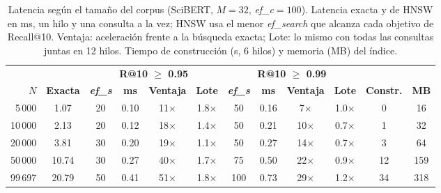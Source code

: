 \begin{table}[tbp]
\caption{Latencia según el tamaño del corpus (SciBERT, $M=32$, \textit{ef\_c}$=100$). Latencia exacta y de HNSW en ms, un hilo y una consulta a la vez; HNSW usa el menor \textit{ef\_search} que alcanza cada objetivo de Recall@10. Ventaja: aceleración frente a la búsqueda exacta; Lote: lo mismo con todas las consultas juntas en 12 hilos. Tiempo de construcción (s, 6 hilos) y memoria (MB) del índice.}\label{tab:escalabilidad_scibert}
\centering
\small
\begin{tabular}{|r|c|c|c|c|c|c|c|c|c|c|c|}
\hline
 & & \multicolumn{4}{c|}{\textbf{R@10 $\geq$ 0.95}} & \multicolumn{4}{c|}{\textbf{R@10 $\geq$ 0.99}} & & \\ \cline{3-10}
\textbf{$N$} & \textbf{Exacta} & \textbf{\textit{ef\_s}} & \textbf{ms} & \textbf{Ventaja} & \textbf{Lote} & \textbf{\textit{ef\_s}} & \textbf{ms} & \textbf{Ventaja} & \textbf{Lote} & \textbf{Constr.} & \textbf{MB} \\
\hline
5\,000 & 1.07 & 20 & 0.10 & 11$\times$ & 1.8$\times$ & 50 & 0.16 & 7$\times$ & 1.0$\times$ & 0 & 16 \\
10\,000 & 2.13 & 20 & 0.12 & 18$\times$ & 1.4$\times$ & 50 & 0.21 & 10$\times$ & 0.7$\times$ & 1 & 32 \\
20\,000 & 3.81 & 30 & 0.20 & 19$\times$ & 1.1$\times$ & 50 & 0.27 & 14$\times$ & 0.7$\times$ & 3 & 64 \\
50\,000 & 10.74 & 30 & 0.27 & 40$\times$ & 1.7$\times$ & 75 & 0.50 & 22$\times$ & 0.9$\times$ & 12 & 159 \\
99\,697 & 20.79 & 50 & 0.41 & 51$\times$ & 1.8$\times$ & 100 & 0.73 & 29$\times$ & 1.2$\times$ & 34 & 318 \\
\hline
\end{tabular}
\end{table}

